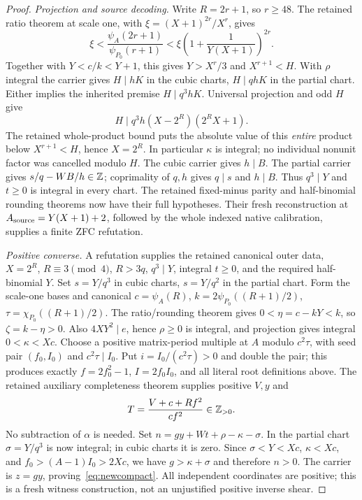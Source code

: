\begin{proof}
\emph{Projection and source decoding.}
Write $R=2r+1$, so $r\ge48$. The retained ratio theorem at scale one,
with $\xi=(X+1)^{2r}/X^r$, gives
\[
 \xi<\frac{\psi_A(2r+1)}{\psi_{P_0}(r+1)}
 <\xi\left(1+\frac1{Y(X+1)}\right)^{2r}.
\]
Together with $Y<c/k<Y+1$, this gives $Y>X^r/3$ and
$X^{r+1}<H$. With $\rho$ integral the carrier gives
$H\mid hK$ in the cubic charts, $H\mid qhK$ in the partial chart.
Either implies the inherited premise $H\mid q^3hK$.
Universal projection and odd $H$ give
\[
 H\mid q^3h(X-2^R)(2^RX+1).
\]
The retained whole-product bound puts the absolute value of this
\emph{entire} product below $X^{r+1}<H$, hence $X=2^R$.
In particular $\kappa$ is integral; no individual nonunit factor was
cancelled modulo $H$.
The cubic carrier gives $h\mid B$. The partial carrier gives
$s/q-WB/h\in\mathbb Z$; coprimality of $q,h$ gives $q\mid s$ and $h\mid B$.
Thus $q^3\mid Y$ and $t\ge0$ is integral in every chart.
The retained fixed-minus parity and half-binomial rounding theorems
now have their full hypotheses. Their fresh reconstruction at
$A_{\rm source}=Y(X+1)+2$, followed by the whole indexed native
calibration, supplies a finite ZFC refutation.

\emph{Positive converse.}
A refutation supplies the retained canonical outer data,
$X=2^R$, $R\equiv3\pmod4$, $R>3q$, $q^3\mid Y$, integral $t\ge0$,
and the required half-binomial $Y$. Set $s=Y/q^3$ in cubic charts,
$s=Y/q^2$ in the partial chart. Form the scale-one bases and canonical
$c=\psi_A(R)$, $k=2\psi_{P_0}((R+1)/2)$, $\tau=\chi_{P_0}((R+1)/2)$.
The ratio/rounding theorem gives $0<\eta=c-kY<k$, so
$\zeta=k-\eta>0$. Also $4XY^2\mid e$, hence $\rho\ge0$ is integral,
and projection gives integral $0<\kappa<Xc$.
Choose a positive matrix-period multiple at $A$ modulo $c^2\tau$,
with seed pair $(f_0,I_0)$ and $c^2\tau\mid I_0$.
Put $i=I_0/(c^2\tau)>0$ and double the pair; this produces exactly
$f=2f_0^2-1$, $I=2f_0I_0$, and all literal root definitions above.
The retained auxiliary completeness theorem supplies positive $V,y$ and
\[
 T=\frac{V+c+Rf^2}{cf^2}\in\mathbb Z_{>0}.
\]
No subtraction of $\alpha$ is needed. Set
$n=gy+Wt+\rho-\kappa-\sigma$.
In the partial chart $\sigma=Y/q^3$ is now integral; in cubic charts
it is zero. Since $\sigma<Y<Xc$, $\kappa<Xc$, and
$f_0>(A-1)I_0>2Xc$, we have $g>\kappa+\sigma$ and therefore $n>0$.
The carrier is $z=gy$, proving~\eqref{eq:newcompact}. All independent
coordinates are positive; this is a fresh witness construction, not an
unjustified positive inverse shear.
\end{proof}

